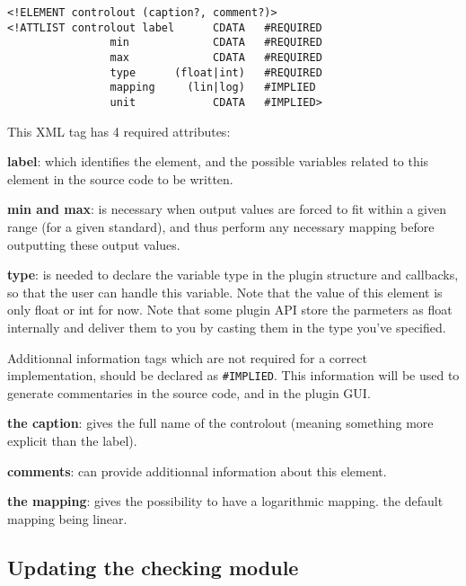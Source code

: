 \begin{verbatim}
<!ELEMENT controlout (caption?, comment?)>
<!ATTLIST controlout label      CDATA   #REQUIRED 
                min             CDATA   #REQUIRED
                max             CDATA   #REQUIRED
                type      (float|int)   #REQUIRED
                mapping     (lin|log)   #IMPLIED
                unit            CDATA   #IMPLIED>
\end{verbatim}

\noindent This XML tag has 4 required attributes:

\begin{description}
\item \textbf{label}: which identifies the element, and the possible variables related to this element in the source code to be written.
\item \textbf{min and max}: is necessary when output values are forced to fit within a given range (for a given standard), and thus perform any necessary mapping before outputting these output values.
\item \textbf{type}: is needed to declare the variable type in the plugin
  structure and callbacks, so that the user can handle this
  variable. Note that the value of this element is only float or int
  for now. Note that some plugin API store the parmeters as float
  internally and deliver them to you by casting them in the type
  you've specified.
\end{description}

\noindent Additionnal information tags which are not required for a correct implementation, should be declared as \verb|#IMPLIED|. This information will be used to generate commentaries in the source code, and in the plugin GUI.

\begin{description}
\item \textbf{the caption}: gives the full name of the controlout (meaning something more explicit than the label).
\item \textbf{comments}: can provide additionnal information about this element.
\item \textbf{the mapping}: gives the possibility to have a
  logarithmic mapping. the default mapping being linear.
\end{description}
 
\subsection{Updating the checking module}

